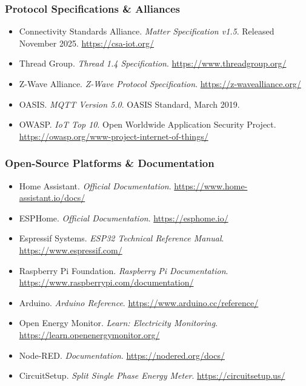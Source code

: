 \documentclass[11pt,letterpaper]{article}
\begin{document}
\subsubsection{Protocol Specifications \& Alliances}
\begin{itemize}[leftmargin=2em]
  \item Connectivity Standards Alliance. \textit{Matter Specification v1.5}. Released November 2025. \url{https://csa-iot.org/}
  \item Thread Group. \textit{Thread 1.4 Specification}. \url{https://www.threadgroup.org/}
  \item Z-Wave Alliance. \textit{Z-Wave Protocol Specification}. \url{https://z-wavealliance.org/}
  \item OASIS. \textit{MQTT Version 5.0}. OASIS Standard, March 2019.
  \item OWASP. \textit{IoT Top 10}. Open Worldwide Application Security Project. \url{https://owasp.org/www-project-internet-of-things/}
\end{itemize}

\subsubsection{Open-Source Platforms \& Documentation}
\begin{itemize}[leftmargin=2em]
  \item Home Assistant. \textit{Official Documentation}. \url{https://www.home-assistant.io/docs/}
  \item ESPHome. \textit{Official Documentation}. \url{https://esphome.io/}
  \item Espressif Systems. \textit{ESP32 Technical Reference Manual}. \url{https://www.espressif.com/}
  \item Raspberry Pi Foundation. \textit{Raspberry Pi Documentation}. \url{https://www.raspberrypi.com/documentation/}
  \item Arduino. \textit{Arduino Reference}. \url{https://www.arduino.cc/reference/}
  \item Open Energy Monitor. \textit{Learn: Electricity Monitoring}. \url{https://learn.openenergymonitor.org/}
  \item Node-RED. \textit{Documentation}. \url{https://nodered.org/docs/}
  \item CircuitSetup. \textit{Split Single Phase Energy Meter}. \url{https://circuitsetup.us/}
\end{itemize}
\end{document}
